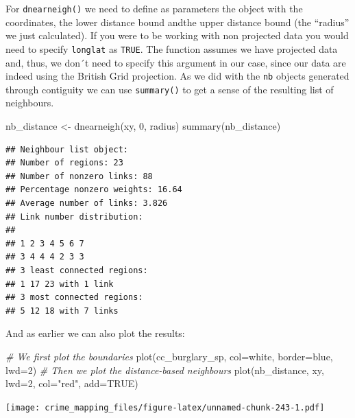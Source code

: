 \documentclass[
  krantz2]{krantz}
\makeatletter
\newenvironment{Shaded}{\begin{snugshade}}{\end{snugshade}}
\newcommand{\AttributeTok}[1]{\textcolor[rgb]{0.61,0.61,0.61}{#1}}
\newcommand{\CommentTok}[1]{\textcolor[rgb]{0.37,0.37,0.37}{\textit{#1}}}
\newcommand{\ConstantTok}[1]{\textcolor[rgb]{0,0,0}{#1}}
\newcommand{\DecValTok}[1]{\textcolor[rgb]{0.06,0.06,0.06}{#1}}
\newcommand{\FunctionTok}[1]{\textcolor[rgb]{0,0,0}{#1}}
\newcommand{\NormalTok}[1]{#1}
\newcommand{\OtherTok}[1]{\textcolor[rgb]{0.37,0.37,0.37}{#1}}
\newcommand{\StringTok}[1]{\textcolor[rgb]{0.5,0.5,0.5}{#1}}
\newenvironment{kframe}{%
\medskip{}
\setlength{\fboxsep}{.8em}
 \def\at@end@of@kframe{}%
 \ifinner\ifhmode%
  \def\at@end@of@kframe{\end{minipage}}%
  \begin{minipage}{\columnwidth}%
 \fi\fi%
 \def\FrameCommand##1{\hskip\@totalleftmargin \hskip-\fboxsep
 \colorbox{shadecolor}{##1}\hskip-\fboxsep
     \hskip-\linewidth \hskip-\@totalleftmargin \hskip\columnwidth}%
 \MakeFramed {\advance\hsize-\width
   \@totalleftmargin\z@ \linewidth\hsize
   \@setminipage}}%
 {\par\unskip\endMakeFramed%
 \at@end@of@kframe}
\renewenvironment{Shaded}{\begin{kframe}}{\end{kframe}}
\makeatother
\begin{document}
For \texttt{dnearneigh()} we need to define as parameters the object with the coordinates, the lower distance bound andthe upper distance bound (the ``radius'' we just calculated). If you were to be working with non projected data you would need to specify \texttt{longlat} as \texttt{TRUE}. The function assumes we have projected data and, thus, we don´t need to specify this argument in our case, since our data are indeed using the British Grid projection. As we did with the \texttt{nb} objects generated through contiguity we can use \texttt{summary()} to get a sense of the resulting list of neighbours.

\begin{Shaded}
\begin{Highlighting}[]
\NormalTok{nb\_distance }\OtherTok{\textless{}{-}} \FunctionTok{dnearneigh}\NormalTok{(xy, }\DecValTok{0}\NormalTok{, radius)}
\FunctionTok{summary}\NormalTok{(nb\_distance)}
\end{Highlighting}
\end{Shaded}

\begin{verbatim}
## Neighbour list object:
## Number of regions: 23 
## Number of nonzero links: 88 
## Percentage nonzero weights: 16.64 
## Average number of links: 3.826 
## Link number distribution:
## 
## 1 2 3 4 5 6 7 
## 3 4 4 4 2 3 3 
## 3 least connected regions:
## 1 17 23 with 1 link
## 3 most connected regions:
## 5 12 18 with 7 links
\end{verbatim}

And as earlier we can also plot the results:

\begin{Shaded}
\begin{Highlighting}[]
\CommentTok{\# We first plot the boundaries}
\FunctionTok{plot}\NormalTok{(cc\_burglary\_sp, }\AttributeTok{col=}\StringTok{\textquotesingle{}white\textquotesingle{}}\NormalTok{, }\AttributeTok{border=}\StringTok{\textquotesingle{}blue\textquotesingle{}}\NormalTok{, }\AttributeTok{lwd=}\DecValTok{2}\NormalTok{)}
\CommentTok{\# Then we plot the distance{-}based neighbours}
\FunctionTok{plot}\NormalTok{(nb\_distance, xy, }\AttributeTok{lwd=}\DecValTok{2}\NormalTok{, }\AttributeTok{col=}\StringTok{"red"}\NormalTok{, }\AttributeTok{add=}\ConstantTok{TRUE}\NormalTok{)}
\end{Highlighting}
\end{Shaded}

\texttt{[image: crime\_mapping\_files/figure-latex/unnamed-chunk-243-1.pdf]}
\end{document}
